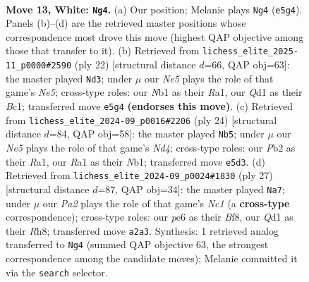 \documentclass[11pt]{article}
\begin{document}
\clearpage

\begin{figure}[p]\centering
\begin{subfigure}{0.46\textwidth}\centering
\resizebox{\linewidth}{!}{%
\newchessgame
\chessboard[
  setfen={rnbr2k1/1pp1bppp/pn1qp3/4N3/2pP4/4B1P1/PP2PPBP/RN1QRK2 w - - 4 13},
  showmover=false,
  pgfstyle=straightmove, color=movearrow, markmove={e5-g4}
]}
\caption{}
\end{subfigure}\hfill
\begin{subfigure}{0.46\textwidth}\centering
\resizebox{\linewidth}{!}{%
\newchessgame
\chessboard[
  setfen={rnb2rk1/1pq2ppp/p2bpn2/4N3/2Pp1P2/NP4P1/P2P2BP/R1BQ1RK1 w - - 0 12},
  showmover=false,
  pgfstyle=straightmove, color=movearrow, markmove={e5-d3}
]}
\caption{}
\end{subfigure}
\\[4pt]
\begin{subfigure}{0.46\textwidth}\centering
\resizebox{\linewidth}{!}{%
\newchessgame
\chessboard[
  setfen={rnb2rk1/pp1n1pbp/1q4p1/4p3/2PN4/1Q2P1P1/PB3PBP/RN3RK1 w - - 0 13},
  showmover=false,
  pgfstyle=straightmove, color=movearrow, markmove={d4-b5}
]}
\caption{}
\end{subfigure}\hfill
\begin{subfigure}{0.46\textwidth}\centering
\resizebox{\linewidth}{!}{%
\newchessgame
\chessboard[
  setfen={r1n1kb1r/1p3ppp/q1n1p3/p2pP2b/B2P4/1Q5P/PP1N1PPN/R1B2RK1 b kq - 7 14},
  showmover=false,
  pgfstyle=straightmove, color=movearrow, markmove={c8-a7}
]}
\caption{}
\end{subfigure}
\caption{\textbf{Move 13, White: \texttt{Ng4}.} (a) Our position; Melanie plays \texttt{Ng4} (\texttt{e5g4}). Panels (b)--(d) are the retrieved master positions whose correspondence most drove this move (highest QAP objective among those that transfer to it). (b) Retrieved from \texttt{lichess\_elite\_2025-11\_p0000\#2590} (ply 22) [structural distance $d$=66, QAP obj=63]: the master played \texttt{Nd3}; under $\mu$ our \emph{Ne5} plays the role of that game's \emph{Ne5}; cross-type roles: our \emph{N}b1 as their \emph{R}a1, our \emph{Q}d1 as their \emph{B}c1; transferred move \texttt{e5g4} \textbf{(endorses this move)}. (c) Retrieved from \texttt{lichess\_elite\_2024-09\_p0016\#2206} (ply 24) [structural distance $d$=84, QAP obj=58]: the master played \texttt{Nb5}; under $\mu$ our \emph{Ne5} plays the role of that game's \emph{Nd4}; cross-type roles: our \emph{P}b2 as their \emph{R}a1, our \emph{R}a1 as their \emph{N}b1; transferred move \texttt{e5d3}. (d) Retrieved from \texttt{lichess\_elite\_2024-09\_p0024\#1830} (ply 27) [structural distance $d$=87, QAP obj=34]: the master played \texttt{Na7}; under $\mu$ our \emph{Pa2} plays the role of that game's \emph{Nc1} (a \textbf{cross-type} correspondence); cross-type roles: our \emph{p}e6 as their \emph{B}f8, our \emph{Q}d1 as their \emph{R}h8; transferred move \texttt{a2a3}. Synthesis: 1 retrieved analog transferred to \texttt{Ng4} (summed QAP objective 63, the strongest correspondence among the candidate moves); Melanie committed it via the \texttt{search} selector.}
\label{fig:thought-m24}
\end{figure}
\end{document}
